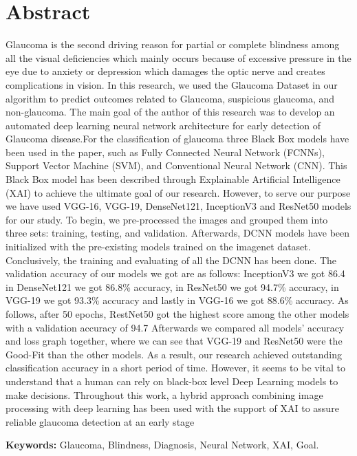 \section*{Abstract}
Glaucoma is the second driving reason for partial or complete blindness among all the visual
deficiencies which mainly occurs because of excessive pressure in the eye due to anxiety or
depression which damages the optic nerve and creates complications in vision. In this
research, we used the Glaucoma Dataset in our algorithm to predict outcomes related to
Glaucoma, suspicious glaucoma, and non-glaucoma. The main goal of the author of this
research was to develop an automated deep learning neural network architecture for early
detection of Glaucoma disease.For the classification of glaucoma three Black Box models
have been used in the paper, such as Fully Connected Neural Network (FCNNs), Support
Vector Machine (SVM), and Conventional Neural Network (CNN). This Black Box model has
been described through Explainable Artificial Intelligence (XAI) to achieve the ultimate goal
of our research. However, to serve our purpose we have used VGG-16, VGG-19,
DenseNet121, InceptionV3 and ResNet50 models for our study. To begin, we pre-processed
the images and grouped them into three sets: training, testing, and validation. Afterwards,
DCNN models have been initialized with the pre-existing models trained on the imagenet
dataset. Conclusively, the training and evaluating of all the DCNN has been done. The
validation accuracy of our models we got are as follows: InceptionV3 we got 86.4%
in DenseNet121 we got 86.8\% accuracy, in ResNet50 we got 94.7\% accuracy, in VGG-19 we
got 93.3\% accuracy and lastly in VGG-16 we got 88.6\% accuracy. As follows, after 50 epochs,
RestNet50 got the highest score among the other models with a validation accuracy of 94.7%
Afterwards we compared all models' accuracy and loss graph together, where we can see that
VGG-19 and ResNet50 were the Good-Fit than the other models. As a result, our research
achieved outstanding classification accuracy in a short period of time. However, it seems to be
vital to understand that a human can rely on black-box level Deep Learning models to make
decisions. Throughout this work, a hybrid approach combining image processing with deep
learning has been used with the support of XAI to assure reliable glaucoma detection at an
early stage

\vspace{1cm}
\noindent \textbf{Keywords:} Glaucoma, Blindness, Diagnosis, Neural Network, XAI, Goal.
\pagebreak
